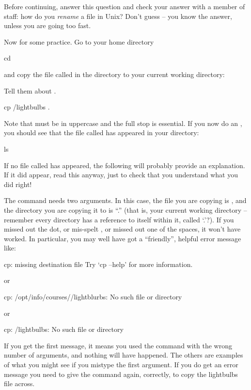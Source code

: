 Before continuing, answer this question and check your answer with a
member of staff: how do you \emph{rename} a file in Unix? Don't guess -- you
know the answer, unless you are going too fast.

Now for some practice. Go to your home directory
%
\begin{ttoutenv}
  cd \return
\end{ttoutenv}
%
and copy the file called  in the \fname{\Dcrsname}
directory to your current working directory:

\begin{note}
Tell them about .  
\end{note}

\begin{ttoutenv}
  cp \Dcrsname/lightbulbs .  \return
\end{ttoutenv}
%
Note that \ilinput{\Dcrsname} must be in uppercase and the full stop is
essential.  If you now do an , you should see that the
file called  has appeared in your directory:

\begin{ttoutenv}
  ls \return
\end{ttoutenv}

If no file called  has appeared, the following will
probably provide an explanation. If it did appear, read this anyway, just to
check that you understand what you did right!

The  command needs two arguments. In this case, the file
you are copying is , and the directory
you are copying it to is ``.'' (that is, your current working
directory -- remember every directory has a reference to itself within
it, called `.'?). If you missed out the dot, or mis-spelt
, or missed out one of the spaces, it
won't have worked. In particular, you may well have got a
``friendly'', helpful error message like:
%
\begin{ttoutenv}
  cp: missing destination file
  Try `cp --help' for more information.
\end{ttoutenv}
%
or
\begin{ttoutenv}
  cp: /opt/info/courses/\crsname/lightblurbs: No such file or directory
\end{ttoutenv}
or
\begin{ttoutenv}
  cp: \crsname/lightbulbs: No such file or directory
\end{ttoutenv}
%
If you get the first message, it means you used the command with the
wrong number of arguments, and nothing will have happened.
The others are examples of what you might see if you mistype the first
argument. If you do get an error message you need to give the command again,
correctly, to copy the lightbulbs file across.

